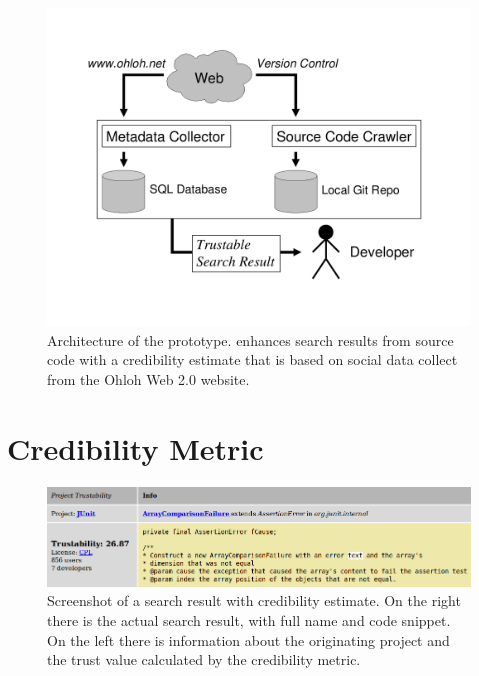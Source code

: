 \begin{figure}
  \centering
    \includegraphics[width=\linewidth]{fig/bender-architecture-diagram}
    \caption{
    {\small
    Architecture of the \Jbd prototype. \Jbd enhances search results from source code with a credibility estimate that is based on social data collect from the Ohloh Web 2.0 website.
    }
    }
    \label{fig:archi}
\end{figure}
\section{Credibility Metric}
\label{sec:metric}

\begin{figure}
  \centering
  	 \includegraphics[width=\linewidth]{fig/bender-screenshot}
    \caption{
    {\small
    Screenshot of a \Jbd search result with credibility estimate. On the right there is the actual search result, with full name and code snippet. On the left there is information about the originating project and the trust value calculated by the credibility metric.
    }
    }
    \label{fig:screenshot}
\end{figure}

